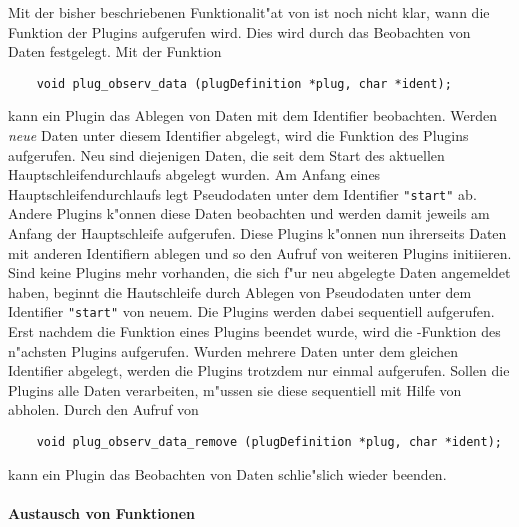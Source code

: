 Mit der bisher beschriebenen Funktionalit"at von \icewing{} ist noch
nicht klar, wann die Funktion  der Plugins aufgerufen
wird. Dies wird durch das Beobachten von Daten festgelegt. Mit der
Funktion
\begin{small}
\linespread{0.9}
\begin{verbatim}
    void plug_observ_data (plugDefinition *plug, char *ident);
\end{verbatim}
\end{small}
kann ein Plugin das Ablegen von Daten mit dem Identifier 
beobachten. Werden \emph{neue} Daten unter diesem Identifier
abgelegt, wird die Funktion  des Plugins
aufgerufen. Neu sind diejenigen Daten, die seit dem Start des
aktuellen Hauptschleifendurchlaufs abgelegt wurden. Am Anfang eines
Hauptschleifendurchlaufs legt \icewing{} Pseudodaten unter dem
Identifier \verb|"start"| ab. Andere Plugins k"onnen diese Daten
beobachten und werden damit jeweils am Anfang der Hauptschleife
aufgerufen. Diese Plugins k"onnen nun ihrerseits Daten mit anderen
Identifiern ablegen und so den Aufruf von weiteren Plugins
initiieren. Sind keine Plugins mehr vorhanden, die sich f"ur neu
abgelegte Daten angemeldet haben, beginnt die Hautschleife durch
Ablegen von Pseudodaten unter dem Identifier \verb|"start"| von
neuem. Die Plugins werden dabei sequentiell aufgerufen. Erst nachdem
die Funktion  eines Plugins beendet wurde, wird die
-Funktion des n"achsten Plugins aufgerufen. Wurden
mehrere Daten unter dem gleichen Identifier abgelegt, werden die
Plugins trotzdem nur einmal aufgerufen. Sollen die Plugins alle
Daten verarbeiten, m"ussen sie diese sequentiell mit Hilfe von
 abholen. Durch den Aufruf von
\begin{small}
\linespread{0.9}
\begin{verbatim}
    void plug_observ_data_remove (plugDefinition *plug, char *ident);
\end{verbatim}
\end{small}
kann ein Plugin das Beobachten von Daten schlie"slich wieder beenden.

\paragraph{Austausch von Funktionen}\hfill\\

